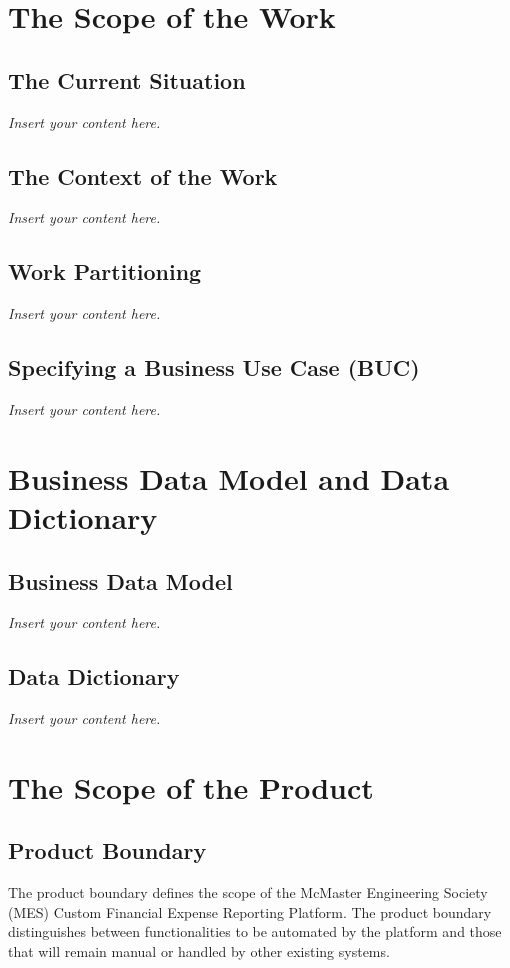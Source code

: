 \documentclass[12pt]{article}
\newcommand{\lips}{\textit{Insert your content here.}}
\begin{document}
\section{The Scope of the Work}
\subsection{The Current Situation}
\lips
\subsection{The Context of the Work}
\lips
\subsection{Work Partitioning}
\lips
\subsection{Specifying a Business Use Case (BUC)}
\lips

\section{Business Data Model and Data Dictionary}
\subsection{Business Data Model}
\lips
\subsection{Data Dictionary}
\lips

\section{The Scope of the Product}

\subsection{Product Boundary}
The product boundary defines the scope of the McMaster Engineering Society (MES) Custom Financial Expense Reporting Platform. The product boundary distinguishes between functionalities to be automated by the platform and those that will remain manual or handled by other existing systems.
\end{document}
